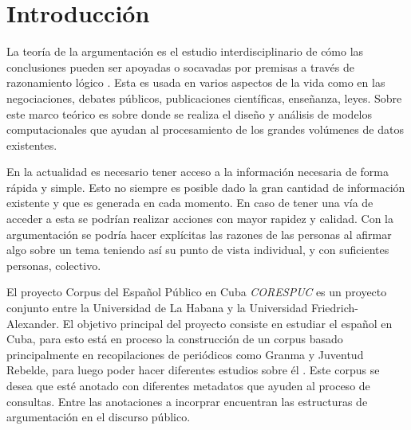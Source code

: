 \chapter*{Introducción}\label{chapter:introduction}


La teoría de la argumentación es el estudio interdisciplinario de cómo las conclusiones
pueden ser apoyadas o socavadas por premisas a través de razonamiento lógico \cite{wiki-arg-theory} .
Esta es usada en varios aspectos de la vida como en las negociaciones, debates públicos, publicaciones
científicas, enseñanza, leyes. Sobre este marco teórico es sobre donde se realiza el diseño y análisis de 
modelos computacionales que ayudan al procesamiento de los grandes volúmenes de datos existentes.

En la actualidad es necesario tener acceso a la información necesaria
de forma rápida y simple. Esto no siempre es posible dado la gran cantidad de información existente y
que es generada en cada momento. En caso de tener una vía de acceder a esta se podrían realizar acciones
con mayor rapidez y calidad. Con la argumentación se podría hacer explícitas las razones de las personas 
al afirmar algo sobre un tema teniendo así su punto de vista individual, y con suficientes personas, colectivo.



El proyecto Corpus del Español Público en Cuba \emph{CORESPUC} es un proyecto conjunto entre la Universidad 
de La Habana y la Universidad Friedrich-Alexander. El objetivo principal del proyecto consiste en estudiar el
español en Cuba, para esto está en proceso la construcción de un corpus basado principalmente 
en recopilaciones de periódicos como Granma y Juventud Rebelde, para luego poder hacer diferentes estudios sobre él
\cite{knauer}. Este corpus se desea que esté anotado con diferentes metadatos que ayuden al proceso de consultas. 
Entre las anotaciones a incorprar encuentran las estructuras de argumentación en el discurso público.


